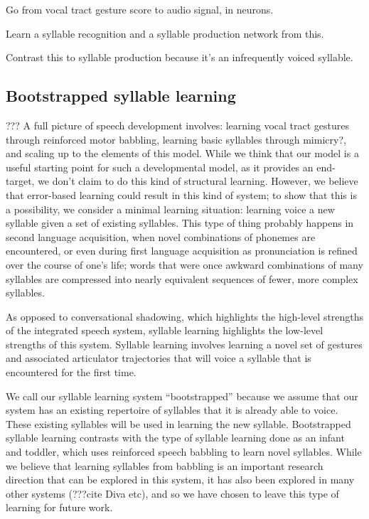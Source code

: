 Go from vocal tract gesture score
to audio signal, in neurons.

Learn a syllable recognition
and a syllable production
network from this.

Contrast this to syllable production because it's
an infrequently voiced syllable.

\subsection{Bootstrapped syllable learning}

??? A full picture of speech development involves:
learning vocal tract gestures
through reinforced motor babbling,
learning basic syllables
through mimicry?,
and scaling up to the elements of this model.
While we think that our model
is a useful starting point for such
a developmental model,
as it provides an end-target,
we don't claim to do this kind of structural learning.
However, we believe that error-based learning
could result in this kind of system;
to show that this is a possibility,
we consider a minimal learning situation:
learning voice a new syllable
given a set of existing syllables.
This type of thing probably happens
in second language acquisition,
when novel combinations of phonemes
are encountered,
or even during first language acquisition
as pronunciation is refined over
the course of one's life;
words that were once awkward combinations
of many syllables are compressed into
nearly equivalent sequences of fewer,
more complex syllables.

As opposed to conversational shadowing,
which highlights the high-level strengths
of the integrated speech system,
syllable learning highlights
the low-level strengths of this system.
Syllable learning involves
learning a novel set of gestures
and associated articulator trajectories
that will voice a syllable
that is encountered for the first time.

We call our syllable learning system ``bootstrapped''
because we assume that our system
has an existing repertoire of syllables
that it is already able to voice.
These existing syllables will be
used in learning the new syllable.
Bootstrapped syllable learning contrasts with
the type of syllable learning
done as an infant and toddler,
which uses reinforced speech babbling
to learn novel syllables.
While we believe that learning syllables
from babbling is an important research direction
that can be explored in this system,
it has also been explored in many other systems
(???cite Diva etc),
and so we have chosen to leave this type of learning
for future work.

